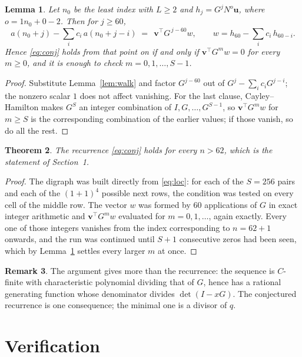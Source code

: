\documentclass[11pt,a4paper]{article}
\theoremstyle{plain}
\newtheorem{theorem}{Theorem}
\newtheorem{lemma}[theorem]{Lemma}
\theoremstyle{definition}
\newtheorem{remark}[theorem]{Remark}
\begin{document}
\begin{lemma}\label{lem:crit}
Let $n_0$ be the least index with $L\ge2$ and $h_j=G^{j}N^{o}\mathbf{u}$, where
$o=1n_0+0-2$. Then for $j\ge60$,
\[
a(n_0+j)-\sum_i c_i\,a(n_0+j-i)\;=\;\,\mathbf{v}^{\!\top}G^{\,j-60}w,
\qquad w=h_{60}-\sum_i c_i\,h_{60-i} .
\]
Hence \eqref{eq:conj} holds from that point on if and only if
$\mathbf{v}^{\!\top}G^{m}w=0$ for every $m\ge0$, and it is enough to check
$m=0,1,\dots,S-1$.
\end{lemma}

\begin{proof}
Substitute Lemma~\ref{lem:walk} and factor $G^{j-60}$ out of
$G^{j}-\sum_ic_iG^{j-i}$; the nonzero scalar $1$ does not affect
vanishing. For the last clause, Cayley--Hamilton makes $G^{S}$ an integer combination of
$I,G,\dots,G^{S-1}$, so $\mathbf{v}^{\!\top}G^{m}w$ for $m\ge S$ is the corresponding
combination of the earlier values; if those vanish, so do all the rest.
\end{proof}

\begin{theorem}
The recurrence \eqref{eq:conj} holds for every $n>62$, which is the statement of
Section~1.
\end{theorem}

\begin{proof}
The digraph was built directly from \eqref{eq:loc}: for each of the $S=256$ pairs and each
of the $(1+1)^{4}$ possible next rows, the condition was tested on every cell of
the middle row. The vector $w$ was formed by $60$ applications of $G$ in exact integer
arithmetic and $\mathbf{v}^{\!\top}G^{m}w$ evaluated for $m=0,1,\dots$, again exactly.
Every one of those integers vanishes from the index corresponding to $n=62+1$ onwards,
and the run was continued until $S+1$ consecutive zeros had been seen, which by
Lemma~\ref{lem:crit} settles every larger $m$ at once.
\end{proof}

\begin{remark}
The argument gives more than the recurrence: the sequence is $C$-finite with characteristic
polynomial dividing that of $G$, hence has a rational generating function whose denominator
divides $\det(I-xG)$. The conjectured recurrence is one consequence; the minimal one is a
divisor of $q$.
\end{remark}

\section{Verification}
\end{document}
